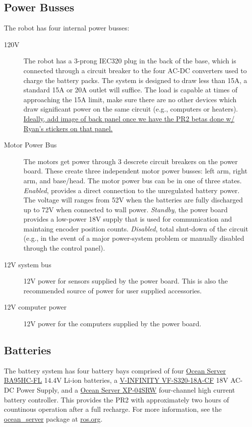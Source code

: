 \subsection{Power Busses}
The robot has four internal power busses:
\begin{description}
\item[120V] The robot has a 3-prong IEC320 plug in the back of the base, which
  is connected through a circuit breaker to the four AC-DC converters used to
  charge the battery packs.  The system is designed to draw less than 15A, a
  standard 15A or 20A outlet will suffice. The load is capable at times of
  approaching the 15A limit, make sure there are no other devices which draw
  significant power on the same circuit (e.g., computers or heaters).
  \underline{Ideally, add image of back panel once we have the PR2 betas done w/
    Ryan's stickers on that panel.}
\item[Motor Power Bus] The motors get power through 3 descrete circuit breakers
  on the power board.  These create three independent motor power busses: left
  arm, right arm, and base/head.  The motor power bus can be in one of three
  states.  \emph{Enabled}, provides a direct connection to the unregulated
  battery power. The voltage will ranges from 52V when the batteries are fully
  discharged up to 72V when connected to wall power.  \emph{Standby}, the power
  board provides a low-power 18V supply that is used for communication and
  maintaing encoder position counts.  \emph{Disabled}, total shut-down of the
  circuit (e.g., in the event of a major power-system problem or manually
  disabled through the control panel).
\item[12V system bus] 12V power for sensors supplied by the power board. This is
  also the recommended source of power for user supplied accessories.
\item[12V computer power] 12V power for the computers supplied by the power
  board.
\end{description}
\subsection{Batteries}
The battery system has four battery bays comprised of four
\href{http://www.oceanserver-store.com/18.html}{Ocean Server BA95HC-FL} 14.4V
Li-ion batteries, a
\href{http://www.v-infinity.com/adtemplate_child.asp?c=710918&p=903285&catky=764537&subcatky1=46887&subcatky2=320934}{V-INFINITY
  VF-S320-18A-CF} 18V AC-DC Power Supply, and a
\href{http://www.oceanserver-store.com/xpmibamamo.html}{Ocean Server XP-04SRW}
four-channel high current battery controller. This provides the PR2 with
approximately two hours of countinous operation after a full recharge.  For more
information, see the \href{http://www.ros.org/wiki/ocean\_server}{ocean\_server}
package at \href{http://www.ros.org}{ros.org}.

